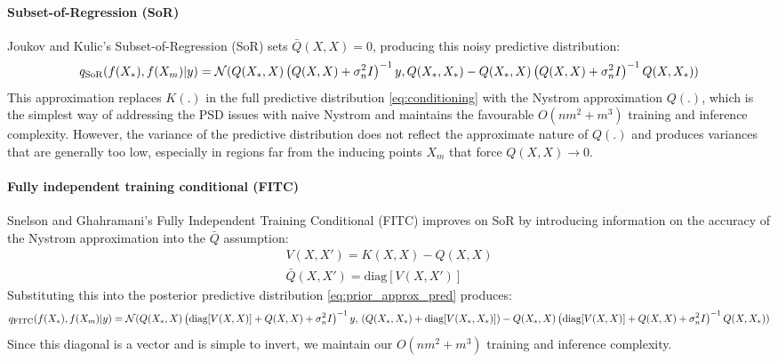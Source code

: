 \paragraph{Subset-of-Regression (SoR)}
Joukov and Kulic's Subset-of-Regression (SoR) \cite{sor} sets $\bar{Q}(X, X) = 0$, producing this noisy predictive distribution:
\begin{equation*}
    q_{\text{SoR}}(f(X_*), f(X_m) | y) = \mathcal{N}( \\
        Q(X_*, X) \left( Q(X, X) + \sigma_n^2 I \right)^{-1} y, \\
        Q(X_*, X_*) - Q(X_*, X) \left( Q(X, X) + \sigma_n^2 I \right)^{-1} Q(X, X_*)
    )
\end{equation*}
This approximation replaces $K(.)$ in the full predictive distribution \ref{eq:conditioning} with the Nystrom approximation $Q(.)$, which is the simplest way of addressing the PSD issues with naive Nystrom and maintains the favourable $O(nm^2 + m^3)$ training and inference complexity.  However, the variance of the predictive distribution does not reflect the approximate nature of $Q(.)$ and produces variances that are generally too low, especially in regions far from the inducing points $X_m$ \cite{big-data} that force $Q(X, X) \to 0$.

\paragraph{Fully independent training conditional (FITC)}
Snelson and Ghahramani's Fully Independent Training Conditional (FITC) \cite{fitc} improves on SoR by introducing information on the accuracy of the Nystrom approximation into the $\bar{Q}$ assumption:
\begin{equation*}
    \begin{aligned}
        V(X, X') = K(X, X) - Q(X, X) \\
        \bar{Q}(X, X') = \text{diag}[V(X, X')]
    \end{aligned}
\end{equation*}
Substituting this into the posterior predictive distribution \ref{eq:prior_approx_pred} produces:
\begin{equation*}
    q_{\text{FITC}}(f(X_*), f(X_m) | y) = \mathcal{N}( \\
        Q(X_*, X) \left( \text{diag}[V(X, X)] + Q(X, X) + \sigma_n^2 I \right)^{-1} y, \\ 
        \left(Q(X_*, X_*) + \text{diag}[V(X_*, X_*)] \right) - Q(X_*, X) \left( \text{diag}[V(X, X)] + Q(X, X) + \sigma_n^2 I \right)^{-1} Q(X, X_*) \\
    )
\end{equation*}
Since this diagonal is a vector and is simple to invert, we maintain our $O(nm^2 + m^3)$ training and inference complexity.

